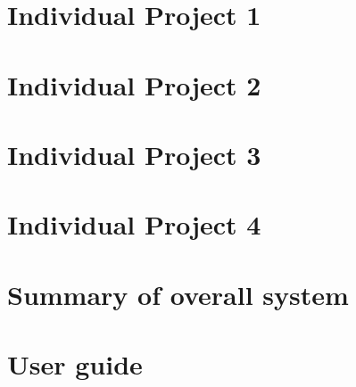 \documentclass[11pt,a4paper]{report}
\begin{document}
\chapter{Individual Project 1}

\chapter{Individual Project 2}

\chapter{Individual Project 3}

\chapter{Individual Project 4}

\chapter{Summary of overall system}

\appendix

\chapter{User guide}

\printbibliography
\end{document}
